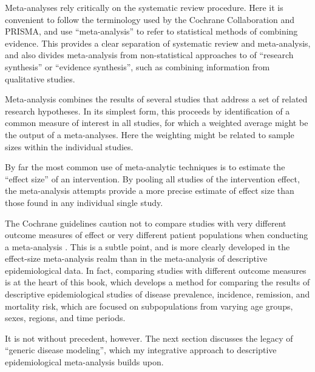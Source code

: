 Meta-analyses rely critically on the systematic review procedure. Here
it is convenient to follow the terminology used by the Cochrane
Collaboration and PRISMA, and use ``meta-analysis'' to refer to
statistical methods of combining evidence.  This provides a clear
separation of systematic review and meta-analysis, and also divides
meta-analysis from non-statistical approaches to of ``research
synthesis'' or ``evidence synthesis'', such as combining information
from qualitative studies.

Meta-analysis combines the results of several studies that address a
set of related research hypotheses. In its simplest form, this
proceeds by identification of a common measure of interest in all studies, for
which a weighted average might be the output of a meta-analyses. Here
the weighting might be related to sample sizes within the individual
studies.

By far the most common use of meta-analytic techniques is to estimate
the ``effect size'' of an intervention.  By pooling all studies of the
intervention effect, the meta-analysis attempts provide a more precise
estimate of effect size than those found in any individual single
study.

The Cochrane guidelines caution not to compare studies with very
different outcome measures of effect or very different patient
populations when conducting a meta-analysis
\cite{Cochrane_Cochrane_2012}. This is a subtle point, and is more
clearly developed in the effect-size meta-analysis realm than in the
meta-analysis of descriptive epidemiological data.  In fact, comparing
studies with different outcome measures is at the heart of this book,
which develops a method for comparing the results of descriptive
epidemiological studies of disease prevalence, incidence, remission,
and mortality risk, which are focused on subpopulations from varying
age groups, sexes, regions, and time periods.

It is not without precedent, however.  The next section discusses the
legacy of ``generic disease modeling'', which my integrative approach
to descriptive epidemiological meta-analysis builds upon.



